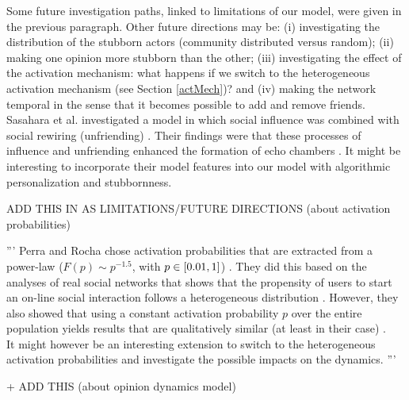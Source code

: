\documentclass[11 pt , letterpaper , twoside , openright]{book}
\begin{document}
Some future investigation paths, linked to limitations of our model, were given in the previous paragraph. Other future directions may be: (i) investigating the distribution of the stubborn actors (community distributed versus random); (ii) making one opinion more stubborn than the other; (iii) investigating the effect of the activation mechanism: what happens if we switch to the heterogeneous activation mechanism (see Section \ref{actMech})? and (iv) making the network temporal in the sense that it becomes possible to add and remove friends. Sasahara et al. investigated a model in which social influence was combined with social rewiring (unfriending) \cite{Sasahara2020}. Their findings were that these processes of influence and unfriending enhanced the formation of echo chambers \cite{Sasahara2020}. It might be interesting to incorporate their model features into our model with algorithmic personalization and stubbornness. 

ADD THIS IN AS LIMITATIONS/FUTURE DIRECTIONS (about activation probabilities)
 
''' Perra and Rocha chose activation probabilities that are extracted from a power-law ($F(p) \sim p^{-1.5}$, with $p \in \interval{0.01}{1}$) \cite{Perra2019}. They did this based on the analyses of real social networks that shows that the propensity of users to start an on-line social interaction follows a heterogeneous distribution \cite{Perra2012}\cite{Perra2019}. However, they also showed that using a constant activation probability $p$ over the entire population yields results that are qualitatively similar (at least in their case) \cite{Perra2019}. \\
\newline
 It might however be an interesting extension to switch to the heterogeneous activation probabilities and investigate the possible impacts on the dynamics. '''
 
+ ADD THIS (about opinion dynamics model)
\end{document}
